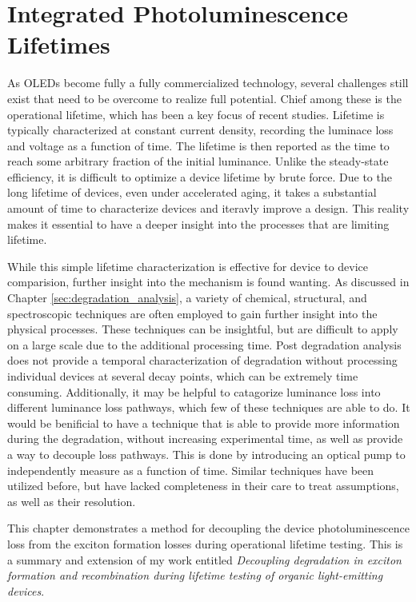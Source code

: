 \documentclass[../thesis.tex]{subfiles}
\begin{document}
\chapter{Integrated Photoluminescence Lifetimes} \label{sec:integrated_lifetime}
As OLEDs become fully a fully commercialized technology, several challenges still exist that need to be overcome to realize full potential.
Chief among these is the operational lifetime, which has been a key focus of recent studies.\cite{Scholz2015,DeMoraes2011,Seifert2013b,Moraes2011,Burrows1994,Seifert2013b}
Lifetime is typically characterized at constant current density, recording the luminace loss and voltage as a function of time.
The lifetime is then reported as the time to reach some arbitrary fraction of the initial luminance.
Unlike the steady-state efficiency, it is difficult to optimize a device lifetime by brute force.  
Due to the long lifetime of devices, even under accelerated aging, it takes a substantial amount of time to characterize devices and iteravly improve a design.
This reality makes it essential to have a deeper insight into the processes that are limiting lifetime.

While this simple lifetime characterization is effective for device to device comparision, further insight into the mechanism is found wanting.
As discussed in Chapter \ref{sec:degradation_analysis}, a variety of chemical, structural, and spectroscopic techniques are often employed to gain further insight into the physical processes.\cite{Seifert2013b,Moraes2011,Scholz2015,Wang2011a,Zhang2016}
These techniques can be insightful, but are difficult to apply on a large scale due to the additional processing time.
Post degradation analysis does not provide a temporal characterization of degradation without processing individual devices at several decay points, which can be extremely time consuming.
Additionally, it may be helpful to catagorize luminance loss into different luminance loss pathways, which few of these techniques are able to do.
It would be benificial to have a technique that is able to provide more information during the degradation, without increasing experimental time, as well as provide a way to decouple loss pathways.
This is done by introducing an optical pump to independently measure \pl as a function of time.
Similar techniques have been utilized before, but have lacked completeness in their care to treat assumptions, as well as their resolution.\cite{Popovic2001,Kondakov2007d,Winter2008a}


This chapter demonstrates a method for decoupling the device photoluminescence loss from the exciton formation losses during operational lifetime testing.  
This is a summary and extension of my work entitled \textit{Decoupling degradation in exciton formation and recombination during lifetime testing of organic light-emitting devices}.\cite{Hershey2017}
\end{document}
